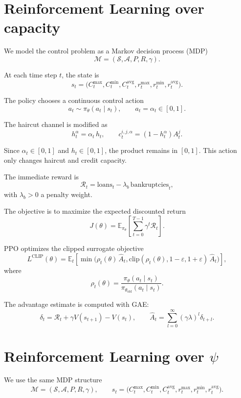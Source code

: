 \documentclass{article}
\begin{document}
\pagestyle{empty}

\section*{Reinforcement Learning over capacity}

We model the control problem as a Markov decision process (MDP)
\[
\mathcal{M} = (\mathcal{S}, \mathcal{A}, P, R, \gamma).
\]

At each time step $t$, the state is
\[
s_t = \big(C^{\max}_t, C^{\min}_t, C^{\mathrm{avg}}_t, r^{\max}_t, r^{\min}_t, r^{\mathrm{avg}}_t\big).
\]

The policy chooses a continuous control action
\[
a_t \sim \pi_\theta(a_t \mid s_t), \qquad a_t = \alpha_t \in [0,1].
\]

The haircut channel is modified as
\[
h_t^{\alpha} = \alpha_t\, h_t,
\qquad
c_t^{i,j,\alpha} = (1 - h_t^{\alpha}) A_t^j.
\]

Since $\alpha_t \in [0,1]$ and $h_t \in [0,1]$, the product remains in $[0,1]$.
This action only changes haircut and credit capacity.

The immediate reward is
\[
\mathcal{R}_t = \text{loans}_t - \lambda_b\,\text{bankruptcies}_t,
\]
with $\lambda_b > 0$ a penalty weight.

The objective is to maximize the expected discounted return
\[
J(\theta) = \mathbb{E}_{\pi_\theta}\left[ \sum_{t=0}^{T-1} \gamma^t \mathcal{R}_t \right].
\]

PPO optimizes the clipped surrogate objective
\[
L^{\mathrm{CLIP}}(\theta) =
\mathbb{E}_t\left[
\min\big(
\rho_t(\theta)\,\hat{A}_t,
\mathrm{clip}(\rho_t(\theta), 1-\varepsilon, 1+\varepsilon)\,\hat{A}_t
\big)
\right],
\]
where
\[
\rho_t(\theta) = \frac{\pi_\theta(a_t\mid s_t)}{\pi_{\theta_{\mathrm{old}}}(a_t\mid s_t)}.
\]

The advantage estimate is computed with GAE:
\[
\delta_t = \mathcal{R}_t + \gamma V(s_{t+1}) - V(s_t),
\qquad
\hat{A}_t = \sum_{l=0}^{\infty} (\gamma \lambda)^l \delta_{t+l}.
\]

\newpage
\section*{Reinforcement Learning over $\psi$}

We use the same MDP structure
\[
\mathcal{M} = (\mathcal{S}, \mathcal{A}, P, R, \gamma),
\qquad
s_t = \big(C^{\max}_t, C^{\min}_t, C^{\mathrm{avg}}_t, r^{\max}_t, r^{\min}_t, r^{\mathrm{avg}}_t\big).
\]
\end{document}
